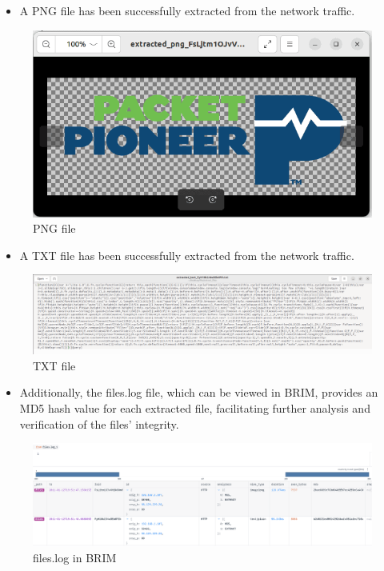 \begin{itemize}
\item A PNG file has been successfully extracted from the network traffic.

 \end{itemize}
\begin{figure}[H]
    \centering
    \includegraphics[width=0.5\linewidth]{images//extract_file/file_extract_3.png}
    \caption{PNG file}
    \label{fig:enter-label}
\end{figure}

\begin{itemize}
\item A TXT file has been successfully extracted from the network traffic.

 \end{itemize}
\begin{figure}[H]
    \centering
    \includegraphics[width=1\linewidth]{images//extract_file/file_extract_4.png}
    \caption{TXT file}
    \label{fig:enter-label}
\end{figure}

\begin{itemize}
\item Additionally, the files.log file, which can be viewed in BRIM, provides an MD5 hash value for each extracted file, facilitating further analysis and verification of the files' integrity.

 \end{itemize}
\begin{figure}[H]
    \centering
    \includegraphics[width=1\linewidth]{images//extract_file/file_extract_5.png}
    \caption{files.log in BRIM}
    \label{fig:enter-label}
\end{figure}

